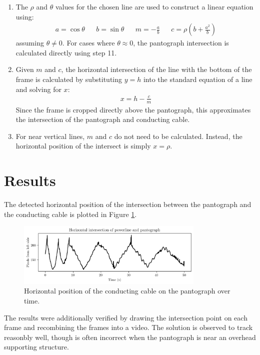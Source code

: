 \begin{enumerate}
  \item The $\rho$ and $\theta$ values for the chosen line are used to construct a linear equation using:
  \begin{align}
    a = \cos\theta && b = \sin\theta && m = -\frac{a}{b} && c = \rho \left(b + \frac{a^2}{b}\right)
  \end{align}
  assuming $\theta \neq 0$. For cases where $\theta \approx 0$, the pantograph intersection is calculated directly using step 11.

  \item Given $m$ and $c$, the horizontal intersection of the line with the bottom of the frame is calculated by substituting $y=h$ into the standard equation of a line and solving for $x$:
  \begin{align}
    x = h - \frac{c}{m}
  \end{align}
  Since the frame is cropped directly above the pantograph, this approximates the intersection of the pantograph and conducting cable.

  \item For near vertical lines, $m$ and $c$ do not need to be calculated. Instead, the horizontal position of the intersect is simply $x=\rho$.

\end{enumerate}

\section{Results}

The detected horizontal position of the intersection between the pantograph and the conducting cable is plotted in Figure \ref{fig:q2results}.

\begin{figure}[ht]
  \centering
  \includegraphics[width=0.8\textwidth]{images/q2_results_a.png}
  \caption{Horizontal position of the conducting cable on the pantograph over time.}
  \label{fig:q2results}
\end{figure}

The results were additionally verified by drawing the intersection point on each frame and recombining the frames into a video. The solution is observed to track reasonbly well, though is often incorrect when the pantograph is near an overhead supporting structure.

